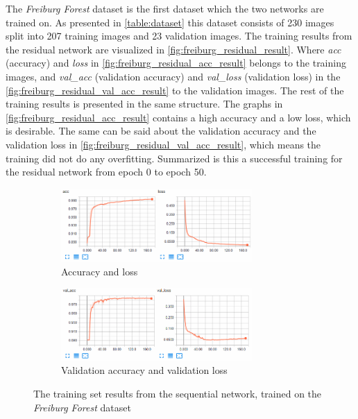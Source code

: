 \documentclass[USenglish]{ifimaster}  %
\begin{document}
The \textit{Freiburg Forest} dataset is the first dataset which the two networks are trained on. As presented in \cref{table:dataset} this dataset consists of 230 images split into 207 training images and 23 validation images. The training results from the residual network are visualized in \cref{fig:freiburg_residual_result}. Where \textit{acc} (accuracy) and \textit{loss} in \cref{fig:freiburg_residual_acc_result} belongs to the training images, and \textit{val\_acc} (validation accuracy) and \textit{val\_loss} (validation loss) in the \cref{fig:freiburg_residual_val_acc_result} to the validation images. The rest of the training results is presented in the same structure. The graphs in \cref{fig:freiburg_residual_acc_result} contains a high accuracy and a low loss, which is desirable. The same can be said about the validation accuracy and the validation loss in \cref{fig:freiburg_residual_val_acc_result}, which means the training did not do any overfitting. Summarized is this a successful training for the residual network from epoch 0 to epoch 50.

\begin{figure}[H]
\centering
\begin{subfigure}[b]{\textwidth}
\centering
\includegraphics[width=0.8\textwidth]{bilder/freiburg_training/freiburg_sequential_training_acc_results.png}
\caption{Accuracy and loss}
\label{fig:freiburg_sequential_acc_result}
\end{subfigure}
\hfill
\begin{subfigure}[b]{\textwidth}
\centering
\includegraphics[width=0.8\textwidth]{bilder/freiburg_training/freiburg_sequential_training_val_acc_results.png}
\caption{Validation accuracy and validation loss}
\label{fig:freiburg_sequential_val_acc_result}
\end{subfigure}
\caption{The training set results from the sequential network, trained on the \textit{Freiburg Forest} dataset}
\label{fig:freiburg_sequential_result}
\end{figure}
\end{document}
